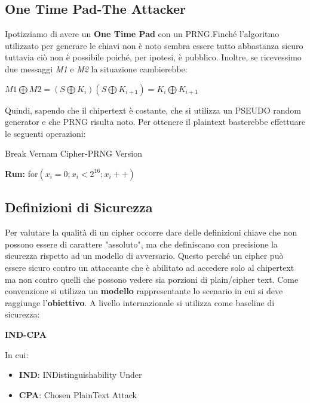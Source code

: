 \documentclass{article}
\theoremstyle{remark}
\begin{document}
\subsection{One Time Pad-The Attacker}
Ipotizziamo di avere un \textbf{One Time Pad} con un PRNG.Finché l'algoritmo utilizzato per generare le chiavi non è noto sembra essere tutto abbastanza sicuro tuttavia ciò non è possibile poiché, per ipotesi, è pubblico. Inoltre, se ricevessimo due messaggi \emph{M1} e \emph{M2} la situazione cambierebbe:
\begin{center}
	\(M1\bigoplus M2 = (S\bigoplus K_i)(S\bigoplus K_{i+1}) = K_i\bigoplus K_{i+1}\)
\end{center}
Quindi, sapendo che il chipertext è costante, che si utilizza un PSEUDO random generator e che PRNG risulta noto. Per ottenere il plaintext basterebbe effettuare le seguenti operazioni:
\begin{algorithm}
	\caption{Break Vernam Cipher-PRNG Version}\label{alg:cap}
	\begin{algorithmic}
		\State\textbf{Run:} for\((x_i=0;x_i<2^{16};x_i++)\)
		{}
	\end{algorithmic}
\end{algorithm}
\subsection{Definizioni di Sicurezza}
Per valutare la qualità di un cipher occorre dare delle definizioni chiave che non possono essere di carattere "assoluto", ma che definiscano con precisione la sicurezza rispetto ad un modello di avversario. Questo perché un cipher può essere sicuro contro un attaccante che è abilitato ad accedere solo al chipertext ma non contro quelli che possono vedere sia porzioni di plain/cipher text. Come convenzione si utilizza un \textbf{modello} rappresentante lo scenario in cui si deve raggiunge l'\textbf{obiettivo}.
A livello internazionale si utilizza come baseline di sicurezza:
\begin{center}
	\textbf{IND-CPA}
\end{center}
In cui:\begin{itemize}
	\item \textbf{IND}: INDistinguishability \newline
	      Under
	\item \textbf{CPA}: Chosen PlainText Attack
\end{itemize}
\end{document}
